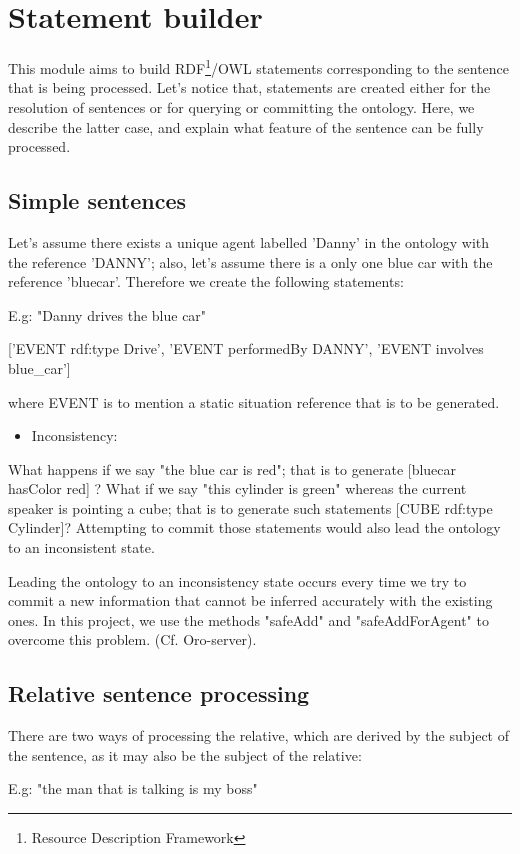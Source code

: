 \documentclass[twoside,a4paper,10pt]{report}
\newcommand{\dokutitleleveltwo}[1]{\chapter{#1}}
\newcommand{\dokutitleleveltree}[1]{\section{#1}}
\newcommand{\dokufootnote}[1]{\footnote{#1}}
\newcommand{\dokuitem}{\item}
\begin{document}
\dokutitleleveltwo{Statement builder}
\label{96858fc1845b81e4956d78bc03e34978}%
This module aims to build RDF\dokufootnote{Resource Description Framework}/OWL statements corresponding to the sentence that is being processed. 
Let's notice that, statements are created either for the resolution of sentences or for querying or committing the ontology.
Here, we describe the latter case, and explain what feature of the sentence can be fully processed.


\dokutitleleveltree{Simple sentences}
\label{83df2a31577b0939e5c2d716b7b579fd}%

Let's assume there exists a unique agent labelled 'Danny' in the ontology with the reference 'DANNY'; also, let's assume there is a only one blue car with the reference 'blue{\textunderscore}car'. Therefore we create the following statements:



\small
\begin{verbatimtab}
  E.g:
  "Danny drives the blue car"
  
  ['EVENT rdf:type Drive',
  'EVENT performedBy DANNY',
  'EVENT involves blue_car']
  
  where EVENT is to mention a static situation reference that is to be generated.
\end{verbatimtab}
\normalsize

\begin{itemize}
\dokuitem  Inconsistency:
\end{itemize}
What happens if we say "the blue car is red"; that is to generate [blue{\textunderscore}car hasColor red] ?
What if we say "this cylinder is green" whereas the current speaker is pointing a cube; that is to generate such statements [CUBE rdf:type Cylinder]?
Attempting to commit those statements would also lead the ontology to an inconsistent state.

Leading the ontology to an inconsistency state occurs every time we try to commit a new information that cannot be inferred accurately with the existing ones.
In this project, we use the methods "safeAdd" and "safeAddForAgent" to overcome this problem. (Cf. Oro-server).


\dokutitleleveltree{Relative sentence processing}
\label{e453b97231b3979c4f8435dc7227a770}%
There are two ways of processing the relative, which are derived by the subject of the sentence, as it may also be the subject of the relative:


\small
\begin{verbatimtab}
  
  E.g: "the man that is talking is my boss"
  
\end{verbatimtab}
\normalsize
\end{document}
